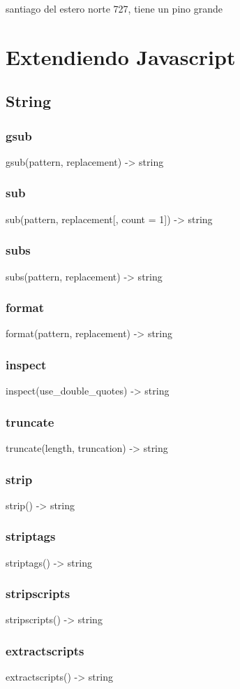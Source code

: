 {{{{{{{{santiago del estero norte 727, tiene un pino grande

\section{Extendiendo Javascript}
\subsection{String}
\subsubsection*{gsub}
gsub(pattern, replacement) -> string
\subsubsection*{sub}
sub(pattern, replacement[, count = 1]) -> string
\subsubsection*{subs}
subs(pattern, replacement) -> string
\subsubsection*{format}
format(pattern, replacement) -> string
\subsubsection*{inspect} 
inspect(use_double_quotes) -> string
\subsubsection*{truncate}
truncate(length, truncation) -> string
\subsubsection*{strip}
strip() -> string
\subsubsection*{striptags}
striptags() -> string
\subsubsection*{stripscripts}
stripscripts() -> string
\subsubsection*{extractscripts}
extractscripts() -> string
}}}}}}}}
